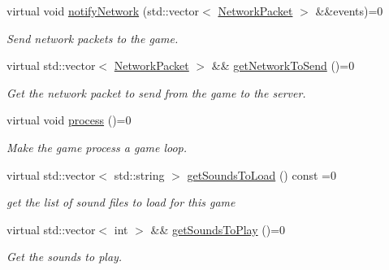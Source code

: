 \begin{DoxyCompactItemize}
virtual void \hyperlink{classarcade_1_1IGame_aaf375290947abf3db32d966facbfacf3}{notify\+Network} (std\+::vector$<$ \hyperlink{structarcade_1_1NetworkPacket}{Network\+Packet} $>$ \&\&events)=0
\begin{DoxyCompactList}\small\item\em Send network packets to the game. \end{DoxyCompactList}\item 
\mbox{\label{classarcade_1_1IGame_a5aa80dfdb3c1881fbc749e3d53efc6f8}} 
virtual std\+::vector$<$ \hyperlink{structarcade_1_1NetworkPacket}{Network\+Packet} $>$ \&\& \hyperlink{classarcade_1_1IGame_a5aa80dfdb3c1881fbc749e3d53efc6f8}{get\+Network\+To\+Send} ()=0
\begin{DoxyCompactList}\small\item\em Get the network packet to send from the game to the server. \end{DoxyCompactList}\item 
\mbox{\label{classarcade_1_1IGame_af0111a41083f38a1af1a7f94287e6e77}} 
virtual void \hyperlink{classarcade_1_1IGame_af0111a41083f38a1af1a7f94287e6e77}{process} ()=0
\begin{DoxyCompactList}\small\item\em Make the game process a game loop. \end{DoxyCompactList}\item 
\mbox{\label{classarcade_1_1IGame_a0b66cd9ef3b5cd0dff95debb7e4f594e}} 
virtual std\+::vector$<$ std\+::string $>$ \hyperlink{classarcade_1_1IGame_a0b66cd9ef3b5cd0dff95debb7e4f594e}{get\+Sounds\+To\+Load} () const =0
\begin{DoxyCompactList}\small\item\em get the list of sound files to load for this game \end{DoxyCompactList}\item 
\mbox{\label{classarcade_1_1IGame_ae3eb6cb6fbc1aeefbbe67b61ee4b07f9}} 
virtual std\+::vector$<$ int $>$ \&\& \hyperlink{classarcade_1_1IGame_ae3eb6cb6fbc1aeefbbe67b61ee4b07f9}{get\+Sounds\+To\+Play} ()=0
\begin{DoxyCompactList}\small\item\em Get the sounds to play. \end{DoxyCompactList}\item 

\end{DoxyCompactItemize}
